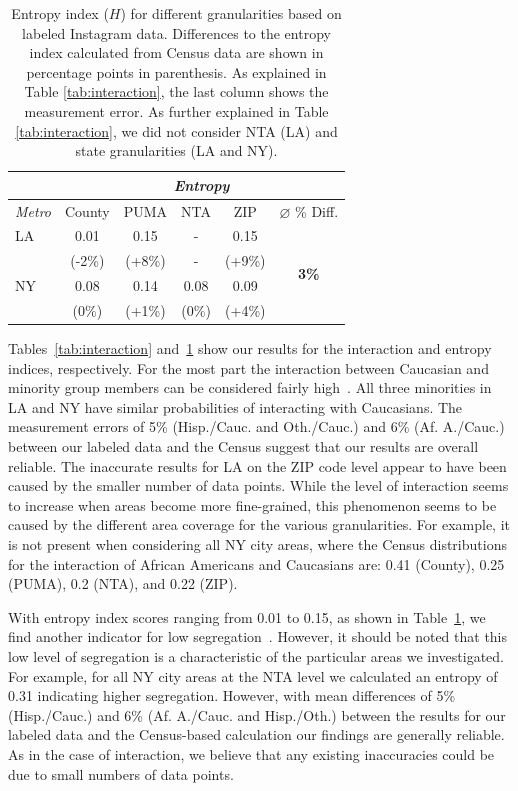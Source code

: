 \begin{table}[t]
\centering
{\small
\begin{tabular}{| l | c | c | c | c | c |}
\hline
 & \multicolumn{5}{c|}{\textit{Entropy}} \\ \hline
\textit{Metro} & County   & PUMA    & NTA    & ZIP    & $\varnothing$ \% Diff.  \\ \hline
LA             & 0.01     & 0.15    & -      & 0.15   & \multirow{4}{*}{\textbf{3\%}}  \\
               & (-2\%)   & (+8\%)  & -      & (+9\%) &  \\ \cline{1-5} 
NY             & 0.08     & 0.14    & 0.08   & 0.09   &  \\
               & (0\%)    & (+1\%)  & (0\%)  & (+4\%) &  \\ \hline
\end{tabular}
}
\caption{Entropy index ($H$) for different granularities based on labeled Instagram data. Differences to the entropy index calculated from Census data are shown in percentage points in parenthesis. As explained in Table \ref{tab:interaction}, the last column shows the measurement error. As further explained in Table \ref{tab:interaction}, we did not consider NTA (LA) and state granularities (LA and NY).}
\label{tab:entropy}
\end{table}

Tables~\ref{tab:interaction} and~\ref{tab:entropy} show our results for the interaction and entropy indices, respectively. For the most part the interaction between Caucasian and minority group members can be considered fairly high~\cite{IcelandDemographic}. All three minorities in LA and NY have similar probabilities of interacting with Caucasians. The measurement errors of 5\% (Hisp./Cauc. and Oth./Cauc.) and 6\% (Af. A./Cauc.) between our labeled data and the Census suggest that our results are overall reliable. The inaccurate results for LA on the ZIP code level appear to have been caused by the smaller number of data points. While the level of interaction seems to increase when areas become more fine-grained, this phenomenon seems to be caused by the different area coverage for the various granularities. For example, it is not present when considering all NY city areas, where the Census distributions for the interaction of African Americans and Caucasians are: 0.41 (County), 0.25 (PUMA), 0.2 (NTA), and 0.22 (ZIP).

With entropy index scores ranging from 0.01 to 0.15, as shown in Table~\ref{tab:entropy}, we find another indicator for low segregation~\cite{IcelandDemographic}. However, it should be noted that this low level of segregation is a characteristic of the particular areas we investigated. For example, for all NY city areas at the NTA level we calculated an entropy of 0.31 indicating higher segregation. However, with mean differences of 5\% (Hisp./Cauc.) and 6\% (Af. A./Cauc. and Hisp./Oth.) between the results for our labeled data and the Census-based calculation our findings are generally reliable. As in the case of interaction, we believe that any existing inaccuracies could be due to small numbers of data points.

